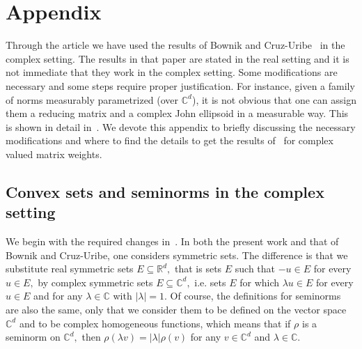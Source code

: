 \documentclass{article}
\theoremstyle{definition}
\theoremstyle{remark}
\numberwithin{equation}{section}
\newcommand{\reals}{\mathbb{R}}
\newcommand{\complex}{\mathbb{C}}
\newcommand{\1}{\mathbf{1}}
\begin{document}
    \appendix
    \section{Appendix}
    \label{s:appendix}

    Through the article we have used the results of Bownik and Cruz-Uribe~\cite{Cruz_Uribe_Bownik_Extrapolation} in the complex setting.
    The results in that paper are stated in the real setting and
    it is not immediate that they work in the complex setting.
    Some modifications are necessary and some steps require proper justification.
    For instance, given a family of norms measurably parametrized (over $\complex^d$),
    it is not obvious that one can assign them a reducing matrix and a complex John ellipsoid
    in a measurable way.
    This is shown in detail in~\cite[Appendix~A]{DKPS2024}.
    We devote this appendix to briefly discussing the necessary modifications
    and where to find the details to get the results of~\cite{Cruz_Uribe_Bownik_Extrapolation}
    for complex valued matrix weights.

    \subsection{Convex sets and seminorms in the complex setting}
    \label{subsec:ComplexConvexAndSeminorms}
    We begin with the required changes in~\cite[Section~2]{Cruz_Uribe_Bownik_Extrapolation}.
    In both the present work and that of Bownik and Cruz-Uribe,
    one considers symmetric sets.
    The difference is that we substitute real symmetric sets $E \subseteq \reals^d,$
    that is sets $E$ such that $-u \in E$ for every $u \in E,$
    by complex symmetric sets $E \subseteq \complex^d,$
    i.e. sets $E$ for which $\lambda u \in E$ for every $u \in E$ and for any $\lambda\in\complex$ with $|\lambda| = 1.$
    Of course, the definitions for seminorms are also the same,
    only that we consider them to be defined on the vector space $\complex^d$
    and to be complex homogeneous functions, which means that if $\rho$
    is a seminorm on $\complex^d,$ then $\rho(\lambda v) = |\lambda| \rho(v)$
    for any $v \in \complex^d$ and $\lambda \in \complex.$
\end{document}
